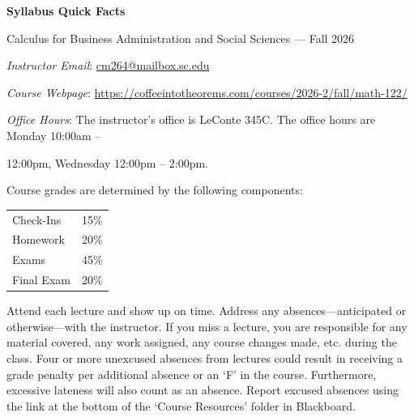 \documentclass[11pt,letterpaper]{article}
\begin{document}
\begin{center} 
\bfseries
\color{scred}
\LARGE Syllabus Quick Facts \par\vspace{0.2\baselineskip}
\Large Calculus for Business Administration and Social Sciences --- Fall 2026
\end{center} \pspace


\hspace{0.53cm} {\itshape Instructor Email}: \href{mailto:cm264@mailbox.sc.edu}{cm264@mailbox.sc.edu} \par
\hspace{0.53cm} {\itshape Course Webpage}: \href{https://coffeeintotheorems.com/courses/2026-2/fall/math-122/}{https://coffeeintotheorems.com/courses/2026-2/fall/math-122/} \par
\hspace{0.53cm} {\itshape Office Hours}: The instructor's office is LeConte 345C. The office hours are Monday 10:00am -- \par\hspace{0.5cm} 12:00pm, Wednesday 12:00pm -- 2:00pm. \pspace


Course grades are determined by the following components: \par \vspace{-0.3cm}
	\begin{table}[!ht]
        \begin{tabular}{lr}
	Check-Ins & 15\% \\
        Homework & 20\% \\
        Exams & 45\% \\
        Final Exam & 20\% \\
        \end{tabular} 
        \end{table}


Attend each lecture and show up on time. Address any absences---anticipated or otherwise---with the instructor. If you miss a lecture, you are responsible for any material covered, any work assigned, any course changes made, etc. during the class. Four or more unexcused absences from lectures could result in receiving a grade penalty per additional absence or an `F' in the course. Furthermore, excessive lateness will also count as an absence. Report excused absences using the link at the bottom of the `Course Resources' folder in Blackboard.
\pspace
\end{document}
